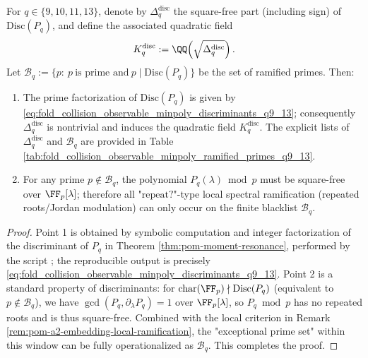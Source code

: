 \begin{proposition}[Discriminant Blacklist and Ramified Prime Set: Local Spectral Ramification Can Only Occur at \texorpdfstring{$p\mid \mathrm{Disc}(P_q)$}{p|Disc(Pq)} (\(q=9,10,11,13\), Auditable)]\label{prop:pom-observable-minpoly-discriminant-ramification-q9-13}
For \(q\in\{9,10,11,13\}\), denote by \(\Delta_q^{\mathrm{disc}}\) the square-free part (including sign) of \(\mathrm{Disc}(P_q)\), and define the associated quadratic field
\[
K_q^{\mathrm{disc}}:=\QQ\!\left(\sqrt{\Delta_q^{\mathrm{disc}}}\right).
\]
Let
\(
\mathcal{B}_q:=\{p:\ p\ \text{is prime and}\ p\mid \mathrm{Disc}(P_q)\}
\)
be the set of ramified primes.
Then:
\begin{enumerate}
  \item The prime factorization of \(\mathrm{Disc}(P_q)\) is given by \eqref{eq:fold_collision_observable_minpoly_discriminants_q9_13}; consequently \(\Delta_q^{\mathrm{disc}}\) is nontrivial and induces the quadratic field \(K_q^{\mathrm{disc}}\). The explicit lists of \(\Delta_q^{\mathrm{disc}}\) and \(\mathcal{B}_q\) are provided in Table \ref{tab:fold_collision_observable_minpoly_ramified_primes_q9_13}.
  \item For any prime \(p\notin\mathcal{B}_q\), the polynomial \(P_q(\lambda)\bmod p\) must be square-free over \(\FF_p[\lambda]\); therefore all "\(\mathrm{repeat?}\)"-type local spectral ramification (repeated roots/Jordan modulation) can only occur on the finite blacklist \(\mathcal{B}_q\).
\end{enumerate}
\end{proposition}
\begin{proof}
Point 1 is obtained by symbolic computation and integer factorization of the discriminant of \(P_q\) in Theorem \ref{thm:pom-moment-resonance}, performed by the script ; the reproducible output is precisely \eqref{eq:fold_collision_observable_minpoly_discriminants_q9_13}.
Point 2 is a standard property of discriminants: for \(\mathrm{char}(\FF_p)\nmid \mathrm{Disc}(P_q)\) (equivalent to \(p\notin\mathcal{B}_q\)), we have
\(\gcd(P_q,\partial_\lambda P_q)=1\) over \(\FF_p[\lambda]\), so \(P_q\bmod p\) has no repeated roots and is thus square-free.
Combined with the local criterion in Remark \ref{rem:pom-a2-embedding-local-ramification}, the "exceptional prime set" within this window can be fully operationalized as \(\mathcal{B}_q\). This completes the proof.
\end{proof}



